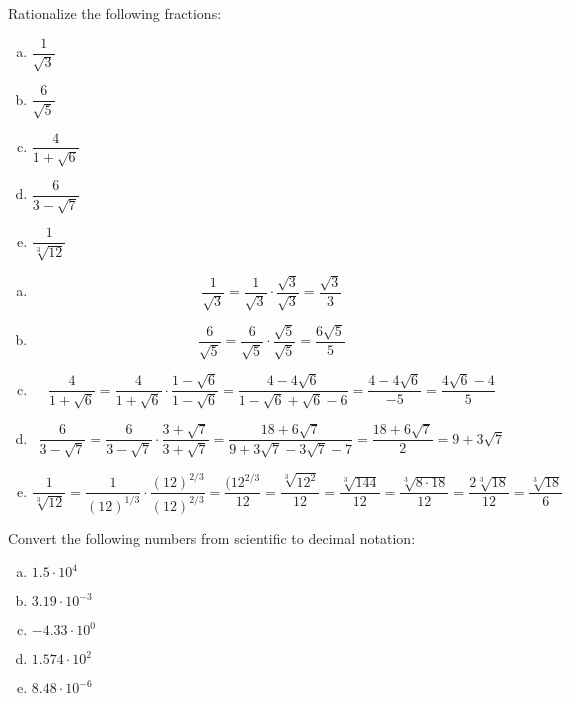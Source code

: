\documentclass[11pt,letterpaper]{article}
\begin{document}
\newpage



 Rationalize the following fractions:
\begin{enumerate}[(a)]
\item $\dfrac{1}{\sqrt{3}}$
\item $\dfrac{6}{\sqrt{5}}$
\item $\dfrac{4}{1 + \sqrt{6}}$
\item $\dfrac{6}{3 - \sqrt{7}}$
\item $\dfrac{1}{\sqrt[3]{12}}$
\end{enumerate} \pspace

\sol
\begin{enumerate}[(a)]
\item 
	\[
	\dfrac{1}{\sqrt{3}}= \dfrac{1}{\sqrt{3}} \cdot \dfrac{\sqrt{3}}{\sqrt{3}}= \dfrac{\sqrt{3}}{3}
	\] \pspace

\item 
	\[
	\dfrac{6}{\sqrt{5}}= \dfrac{6}{\sqrt{5}} \cdot \dfrac{\sqrt{5}}{\sqrt{5}}= \dfrac{6\sqrt{5}}{5}
	\] \pspace

\item 
	\[
	\dfrac{4}{1 + \sqrt{6}}= \dfrac{4}{1 + \sqrt{6}} \cdot \dfrac{1 - \sqrt{6}}{1 - \sqrt{6}}= \dfrac{4 - 4\sqrt{6}}{1 - \sqrt{6} + \sqrt{6} - 6}= \dfrac{4 - 4\sqrt{6}}{-5}= \dfrac{4\sqrt{6} - 4}{5}
	\]

\item 
	\[
	\dfrac{6}{3 - \sqrt{7}}= \dfrac{6}{3 - \sqrt{7}} \cdot \dfrac{3 + \sqrt{7}}{3 + \sqrt{7}}= \dfrac{18 + 6\sqrt{7}}{9 + 3\sqrt{7} - 3\sqrt{7} - 7}= \dfrac{18 + 6\sqrt{7}}{2}= 9 + 3\sqrt{7}
	\] \pspace

\item 
	\[
	\dfrac{1}{\sqrt[3]{12}}= \dfrac{1}{(12)^{1/3}} \cdot \dfrac{(12)^{2/3}}{(12)^{2/3}}= \dfrac{(12^{2/3}}{12}= \dfrac{\sqrt[3]{12^2}}{12}= \dfrac{\sqrt[3]{144}}{12}= \dfrac{\sqrt[3]{8 \cdot 18}}{12}= \dfrac{2\sqrt[3]{18}}{12}= \dfrac{\sqrt[3]{18}}{6}
	\]
\end{enumerate}



\newpage



 Convert the following numbers from scientific to decimal notation:
\begin{enumerate}[(a)]
\item $1.5 \cdot 10^4$
\item $3.19 \cdot 10^{-3}$
\item $-4.33 \cdot 10^0$
\item $1.574 \cdot 10^2$
\item $8.48 \cdot 10^{-6}$
\end{enumerate} \pspace
\end{document}
